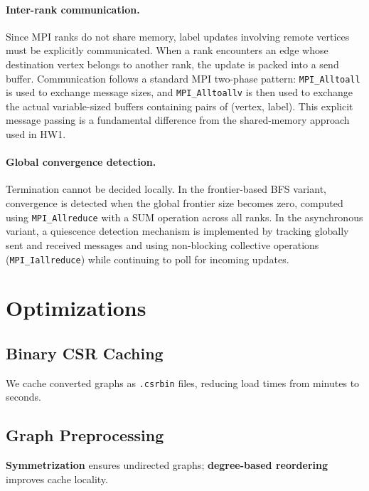 \documentclass[11pt,a4paper]{article}
\begin{document}
\paragraph{Inter-rank communication.}
Since MPI ranks do not share memory, label updates involving remote vertices must be explicitly communicated. When a rank encounters an edge whose destination vertex belongs to another rank, the update is packed into a send buffer. Communication follows a standard MPI two-phase pattern: \texttt{MPI\_Alltoall} is used to exchange message sizes, and \texttt{MPI\_Alltoallv} is then used to exchange the actual variable-sized buffers containing pairs of (vertex, label). This explicit message passing is a fundamental difference from the shared-memory approach used in HW1.

\paragraph{Global convergence detection.}
Termination cannot be decided locally. In the frontier-based BFS variant, convergence is detected when the global frontier size becomes zero, computed using \texttt{MPI\_Allreduce} with a SUM operation across all ranks. In the asynchronous variant, a quiescence detection mechanism is implemented by tracking globally sent and received messages and using non-blocking collective operations (\texttt{MPI\_Iallreduce}) while continuing to poll for incoming updates.


\section{Optimizations}

\subsection{Binary CSR Caching}
We cache converted graphs as \texttt{.csrbin} files, reducing load times from minutes to seconds.

\subsection{Graph Preprocessing}
\textbf{Symmetrization} ensures undirected graphs; \textbf{degree-based reordering} improves cache locality.
\end{document}
